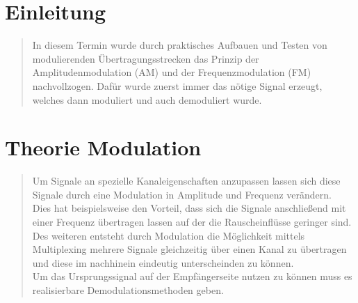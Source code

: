 \section{Einleitung}
\begin{quote}
	In diesem Termin wurde durch praktisches Aufbauen und Testen von modulierenden
	Übertragungsstrecken das Prinzip der Amplitudenmodulation (AM) und der
	Frequenzmodulation (FM) nachvollzogen. Dafür wurde zuerst immer das nötige
	Signal erzeugt, welches dann moduliert und auch demoduliert wurde.
\end{quote}
\section{Theorie Modulation}
\begin{quote}
        Um Signale an spezielle Kanaleigenschaften anzupassen lassen sich diese Signale durch eine Modulation in
        Amplitude und Frequenz verändern.\\
        Dies hat beispielsweise den Vorteil, dass sich die Signale anschließend mit einer Frequenz
        übertragen lassen auf der die Rauscheinflüsse geringer sind. Des weiteren entsteht durch Modulation die
        Möglichkeit mittels Multiplexing mehrere Signale gleichzeitig über einen Kanal zu übertragen und diese im
        nachhinein eindeutig unterscheinden zu können.\\
        Um das Ursprungssignal auf der Empfängerseite nutzen zu können muss es realisierbare Demodulationsmethoden
        geben.
\end{quote}



